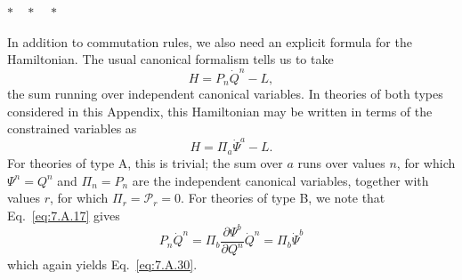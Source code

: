 \begin{center}
$*\quad*\quad*$
\end{center}

In addition to commutation rules, we also need an explicit formula for the
Hamiltonian. The usual canonical formalism tells us to take
\begin{equation}
  H=P_n\dot Q^n-L,
  \tag{7.A.29}\label{eq:7.A.29}
\end{equation}
the sum running over independent canonical variables. In theories of both
types considered in this Appendix, this Hamiltonian may be written in terms
of the constrained variables as
\begin{equation}
  H=\Pi_a\dot\Psi^a-L.
  \tag{7.A.30}\label{eq:7.A.30}
\end{equation}
For theories of type A, this is trivial; the sum over $a$ runs over values
$n$, for which $\Psi^n=Q^n$ and $\Pi_n=P_n$ are the independent canonical
variables, together with values $r$, for which
$\Pi_r=\mathcal{P}_r=0$. For theories of type B, we note that Eq.~\eqref{eq:7.A.17}
gives
\[
  P_n\dot Q^n=\Pi_b\frac{\partial\Psi^b}{\partial Q^n}\dot Q^n
  =\Pi_b\dot\Psi^b
\]
which again yields Eq.~\eqref{eq:7.A.30}.

